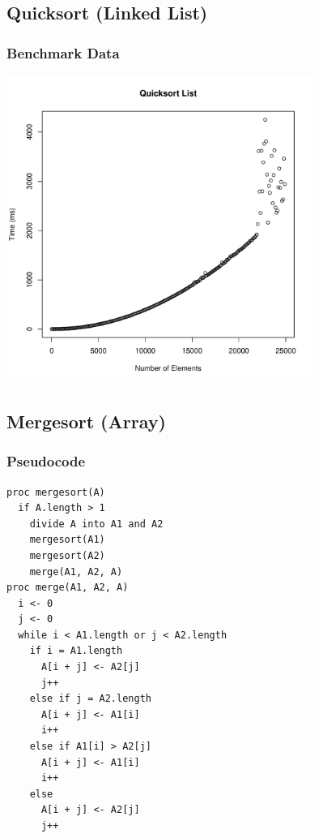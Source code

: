 \documentclass[a4paper,12pt]{article}
\begin{document}
\subsection{Quicksort (Linked List)}
\subsubsection{Benchmark Data}
\includegraphics[height=10cm]{quicksort_list}
\subsection{Mergesort (Array)}
\subsubsection{Pseudocode}
\begin{verbatim}
proc mergesort(A)
  if A.length > 1
    divide A into A1 and A2
    mergesort(A1)
    mergesort(A2)
    merge(A1, A2, A)
proc merge(A1, A2, A)
  i <- 0
  j <- 0
  while i < A1.length or j < A2.length
    if i = A1.length
      A[i + j] <- A2[j]
      j++
    else if j = A2.length
      A[i + j] <- A1[i]
      i++
    else if A1[i] > A2[j]
      A[i + j] <- A1[i]
      i++
    else 
      A[i + j] <- A2[j]
      j++     
\end{verbatim}
\end{document}
